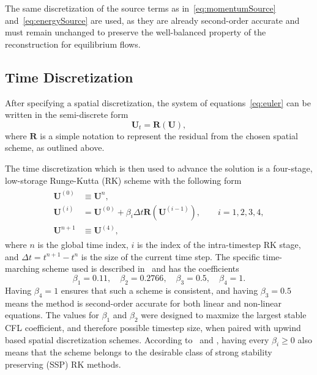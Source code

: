 The same discretization of the source terms as in~\eqref{eq:momentumSource} and~\eqref{eq:energySource} are used, as they are already second-order accurate and must remain unchanged to preserve the well-balanced property of the reconstruction for equilibrium flows.

\subsection{Time Discretization}
\label{subsec:time}

After specifying a spatial discretization, the system of equations~\eqref{eq:euler} can be written in the semi-discrete form
\begin{equation}
\mathbf{U}_t=\mathbf{R}(\mathbf{U}),
\end{equation}
where $\mathbf{R}$ is a simple notation to represent the residual from the chosen spatial scheme, as outlined above.

The time discretization which is then used to advance the solution is a four-stage, low-storage Runge-Kutta (RK) scheme with the following form
\begin{align}
\begin{split}
\mathbf{U}^{(0)} &\equiv \mathbf{U}^n,\\
\mathbf{U}^{(i)} &= \mathbf{U}^{(0)} + \beta_i \Delta t \mathbf{R} \left(\mathbf{U}^{(i-1)}\right),\qquad i=1,2,3,4,\\
\mathbf{U}^{n+1} &\equiv \mathbf{U}^{(4)},
\end{split}
\end{align}
where $n$ is the global time index, $i$ is the index of the intra-timestep RK stage, and $\Delta t=t^{n+1}-t^n$ is the size of the current time step. The specific time-marching scheme used is described in~\cite{Lallemand1990} and has the coefficients
\begin{equation}
\beta_1=0.11,\quad \beta_2=0.2766,\quad \beta_3=0.5,\quad \beta_4=1.
\end{equation}
Having $\beta_4=1$ ensures that such a scheme is consistent, and having $\beta_3=0.5$ means the method is second-order accurate for both linear and non-linear equations. The values for $\beta_1$ and $\beta_2$ were designed to maxmize the largest stable CFL coefficient, and therefore possible timestep size, when paired with upwind based spatial discretization schemes. According to~\cite{Shu1988} and \cite{Macdonald2003}, having every $\beta_i \geq 0$ also means that the scheme belongs to the desirable class of strong stability preserving (SSP) RK methods.


